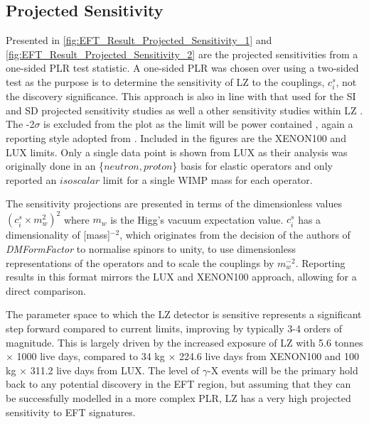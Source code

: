 \subsection{Projected Sensitivity}
\par
Presented in \autoref{fig:EFT_Result_Projected_Sensitivity_1} and \autoref{fig:EFT_Result_Projected_Sensitivity_2} are the projected sensitivities from a one-sided PLR test statistic.
A one-sided PLR was chosen over using a two-sided test as the purpose is to determine the sensitivity of LZ to the couplings, $c^s_i$, not the discovery significance. 
This approach is also in line with that used for the SI and SD projected sensitivity studies \cite{LZ_projected_sensitivity_paper_ref} as well a other sensitivity studies within LZ \cite{LZ_Ibles_LZStats_Thesis_ref, umituktu_thesis_ref}.
The -2$\sigma$ is excluded from the plot as the limit will be power contained \cite{power_constrained_limits_ref}, again a reporting style adopted from \cite{LZ_projected_sensitivity_paper_ref}.
Included in the figures are the XENON100 \cite{xenon100_eft_ref} and LUX \cite{LUX_RUN4_EFT_2021} limits.
Only a single data point is shown from LUX as their analysis was originally done in an \{$neutron,proton$\} basis for elastic operators and only reported an $isoscalar$ limit for a single WIMP mass for each operator.
\par
The sensitivity projections are presented in terms of the dimensionless values $({c}^{s}_{i}\times{m}^{2}_{w})^{2}$ where $m_w$ is the Higg's vacuum expectation value.
${c}^{s}_{i}$ has a dimensionality of [mass]$^{-2}$, which originates from the decision of the authors of \textit{DMFormFactor} to normalise spinors to unity, to use dimensionless representations of the operators and to scale the couplings by $m^{-2}_w$.
Reporting results in this format mirrors the LUX and XENON100 approach, allowing for a direct comparison.
\par
The parameter space to which the LZ detector is sensitive represents a significant step forward compared to current limits, improving by typically 3-4 orders of magnitude.
This is largely driven by the increased exposure of LZ with 5.6 tonnes $\times$ 1000 live days, compared to 34 kg $\times$ 224.6 live days from XENON100 and 100 kg $\times$ 311.2 live days from LUX.
The level of $\gamma$-X events will be the primary hold back to any potential discovery in the EFT region, but assuming that they can be successfully modelled in a more complex PLR, LZ has a very high projected sensitivity to EFT signatures.

